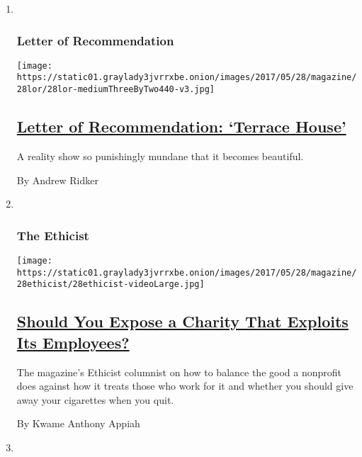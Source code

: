 \begin{enumerate}
\def\labelenumi{\arabic{enumi}.}
\item ~
  \hypertarget{letter-of-recommendation}{%
  \subsubsection{Letter of
  Recommendation}\label{letter-of-recommendation}}

  \texttt{[image: https://static01.graylady3jvrrxbe.onion/images/2017/05/28/magazine/28lor/28lor-mediumThreeByTwo440-v3.jpg]}

  \hypertarget{letter-of-recommendation-terrace-house}{%
  \subsection{\texorpdfstring{\href{/2017/05/25/magazine/letter-of-recommendation-terrace-house.html}{Letter
  of Recommendation: `Terrace
  House'}}{Letter of Recommendation: `Terrace House'}}\label{letter-of-recommendation-terrace-house}}

  A reality show so punishingly mundane that it becomes beautiful.

  By Andrew Ridker
\item ~
  \hypertarget{the-ethicist}{%
  \subsubsection{The Ethicist}\label{the-ethicist}}

  \texttt{[image: https://static01.graylady3jvrrxbe.onion/images/2017/05/28/magazine/28ethicist/28ethicist-videoLarge.jpg]}

  \hypertarget{should-you-expose-a-charity-that-exploits-its-employees}{%
  \subsection{\texorpdfstring{\href{/2017/05/24/magazine/should-you-expose-a-charity-that-exploits-its-employees.html}{Should
  You Expose a Charity That Exploits Its
  Employees?}}{Should You Expose a Charity That Exploits Its Employees?}}\label{should-you-expose-a-charity-that-exploits-its-employees}}

  The magazine's Ethicist columnist on how to balance the good a
  nonprofit does against how it treats those who work for it and whether
  you should give away your cigarettes when you quit.

  By Kwame Anthony Appiah
\item ~
  \hypertarget{judge-john-hodgman}{%
}
\end{enumerate}
